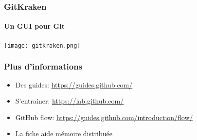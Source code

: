\documentclass[aspectratio=169]{beamer}
\begin{document}
\begin{frame}
  \frametitle{GitKraken}
  \framesubtitle{Un GUI pour Git}
  \centering
  \texttt{[image: gitkraken.png]}
\end{frame}

\begin{frame}
  \frametitle{Plus d'informations}
  \begin{itemize}
    \item Des guides: \url{https://guides.github.com/}
    \item S'entrainer: \url{https://lab.github.com/}
    \item GitHub flow: \url{https://guides.github.com/introduction/flow/}
    \item La fiche aide mémoire distribuée
  \end{itemize}
\end{frame}
\end{document}
